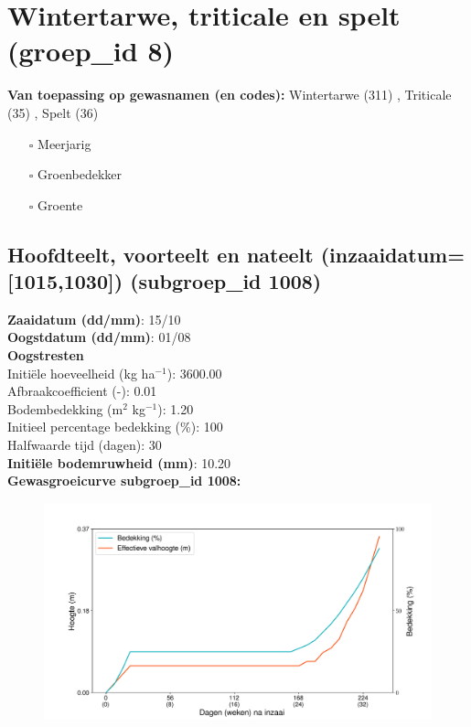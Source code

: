 \documentclass{article}
\begin{document}
 \section{Wintertarwe, triticale en spelt (groep\_id 8)} 
 \textbf{Van toepassing op gewasnamen (en codes):} Wintertarwe (311) , Triticale (35) , Spelt (36) 
 \begin{multicols}{3} \begin{itemize} \item[$\square$] Meerjarig \item[$\square$] Groenbedekker \item[$\square$] Groente \end{itemize} \end{multicols} 
 \subsection{Hoofdteelt, voorteelt en nateelt (inzaaidatum=[1015,1030]) (subgroep\_id 1008)} 
  \textbf{Zaaidatum (dd/mm)}: 15/10  \vspace{0.10cm} \\ 
  \textbf{Oogstdatum (dd/mm)}: 01/08  \vspace{0.10cm} \\ 
  \textbf{Oogstresten} \vspace{0.05cm} \\ 
  \tab Initi\"{e}le hoeveelheid (kg ha$^{-1}$): 3600.00 \vspace{0.05cm} \\ 
  \tab Afbraakcoefficient (-): 0.01 \vspace{0.05cm} \\ 
  \tab Bodembedekking (m$^2$ kg$^{-1}$): 1.20 \vspace{0.05cm} \\ 
  \tab Initieel percentage bedekking (\%): 100 \vspace{0.05cm} \\ 
  \tab Halfwaarde tijd (dagen): 30 \vspace{0.05cm} \\ 
  \textbf{Initi\"{e}le bodemruwheid (mm)}: 10.20 \vspace{0.05cm} \\ 
  \textbf{Gewasgroeicurve subgroep\_id 1008:} 
 \begin{center} \begin{figure}[H] \includegraphics[width=12.5cm]{temp/1008.png} \end{figure} \end{center} 
\end{document}

